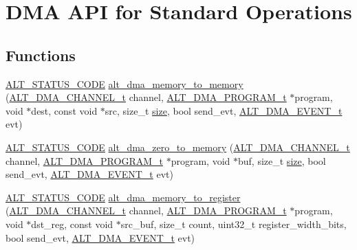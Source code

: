 \hypertarget{group__ALT__DMA__STD__OPS}{}\section{D\+MA A\+PI for Standard Operations}
\label{group__ALT__DMA__STD__OPS}
\subsection*{Functions}
\begin{DoxyCompactItemize}
\item 
\mbox{\hyperlink{hwlib_8h_abdb0d369f069723ca55d6c94bcaaaa12}{A\+L\+T\+\_\+\+S\+T\+A\+T\+U\+S\+\_\+\+C\+O\+DE}} \mbox{\hyperlink{group__ALT__DMA__STD__OPS_ga98eaff0bc9e6fa81379866be85c79a80}{alt\+\_\+dma\+\_\+memory\+\_\+to\+\_\+memory}} (\mbox{\hyperlink{group__ALT__DMA__COMMON_ga959232e3b00ce45a3049183cce4c9d59}{A\+L\+T\+\_\+\+D\+M\+A\+\_\+\+C\+H\+A\+N\+N\+E\+L\+\_\+t}} channel, \mbox{\hyperlink{group__ALT__DMA__PRG_gadb7028531574894854db4db6d797de97}{A\+L\+T\+\_\+\+D\+M\+A\+\_\+\+P\+R\+O\+G\+R\+A\+M\+\_\+t}} $\ast$program, void $\ast$dest, const void $\ast$src, size\+\_\+t \mbox{\hyperlink{sun4u_2tte_8h_a245260f6f74972558f61b85227df5aae}{size}}, bool send\+\_\+evt, \mbox{\hyperlink{group__ALT__DMA__COMMON_gad02f1735ad41b201414e8d032e0f9426}{A\+L\+T\+\_\+\+D\+M\+A\+\_\+\+E\+V\+E\+N\+T\+\_\+t}} evt)
\item 
\mbox{\hyperlink{hwlib_8h_abdb0d369f069723ca55d6c94bcaaaa12}{A\+L\+T\+\_\+\+S\+T\+A\+T\+U\+S\+\_\+\+C\+O\+DE}} \mbox{\hyperlink{group__ALT__DMA__STD__OPS_gaecb95fceaec7eb79dac11e99653810f2}{alt\+\_\+dma\+\_\+zero\+\_\+to\+\_\+memory}} (\mbox{\hyperlink{group__ALT__DMA__COMMON_ga959232e3b00ce45a3049183cce4c9d59}{A\+L\+T\+\_\+\+D\+M\+A\+\_\+\+C\+H\+A\+N\+N\+E\+L\+\_\+t}} channel, \mbox{\hyperlink{group__ALT__DMA__PRG_gadb7028531574894854db4db6d797de97}{A\+L\+T\+\_\+\+D\+M\+A\+\_\+\+P\+R\+O\+G\+R\+A\+M\+\_\+t}} $\ast$program, void $\ast$buf, size\+\_\+t \mbox{\hyperlink{sun4u_2tte_8h_a245260f6f74972558f61b85227df5aae}{size}}, bool send\+\_\+evt, \mbox{\hyperlink{group__ALT__DMA__COMMON_gad02f1735ad41b201414e8d032e0f9426}{A\+L\+T\+\_\+\+D\+M\+A\+\_\+\+E\+V\+E\+N\+T\+\_\+t}} evt)
\item 
\mbox{\hyperlink{hwlib_8h_abdb0d369f069723ca55d6c94bcaaaa12}{A\+L\+T\+\_\+\+S\+T\+A\+T\+U\+S\+\_\+\+C\+O\+DE}} \mbox{\hyperlink{group__ALT__DMA__STD__OPS_ga1f8c3b178c6273d7d0da2ac6e60a6a3f}{alt\+\_\+dma\+\_\+memory\+\_\+to\+\_\+register}} (\mbox{\hyperlink{group__ALT__DMA__COMMON_ga959232e3b00ce45a3049183cce4c9d59}{A\+L\+T\+\_\+\+D\+M\+A\+\_\+\+C\+H\+A\+N\+N\+E\+L\+\_\+t}} channel, \mbox{\hyperlink{group__ALT__DMA__PRG_gadb7028531574894854db4db6d797de97}{A\+L\+T\+\_\+\+D\+M\+A\+\_\+\+P\+R\+O\+G\+R\+A\+M\+\_\+t}} $\ast$program, void $\ast$dst\+\_\+reg, const void $\ast$src\+\_\+buf, size\+\_\+t count, uint32\+\_\+t register\+\_\+width\+\_\+bits, bool send\+\_\+evt, \mbox{\hyperlink{group__ALT__DMA__COMMON_gad02f1735ad41b201414e8d032e0f9426}{A\+L\+T\+\_\+\+D\+M\+A\+\_\+\+E\+V\+E\+N\+T\+\_\+t}} evt)

\end{DoxyCompactItemize}

